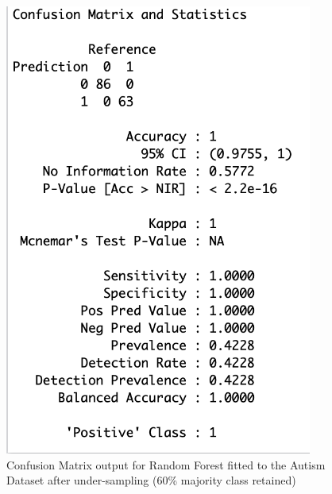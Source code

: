 \begin{figure}[!htbp]
    \centering
    \begin{minipage}{0.45\textwidth}
        \centering
        \includegraphics[width=0.9\textwidth]{ThesisTemplate/appendix/images/Chapter5Appendix/ConfusionMatrix60/Autism.png}
        \caption{Confusion Matrix output for Random Forest fitted to the Autism Dataset after under-sampling (60\% majority class retained)}
        \label{fig:my_label}
    \end{minipage}\hfill
    \begin{minipage}{0.45\textwidth}
        \centering

\end{minipage}
\end{figure}
